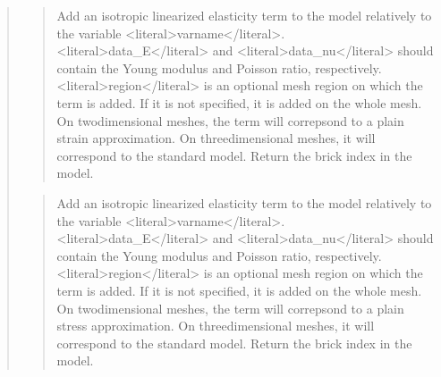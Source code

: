 \documentclass[a4paper,11pt,english]{sphinxmanual}
\begin{document}
\begin{quote}
\sphinxAtStartPar
{}
\begin{quote}

\sphinxAtStartPar
Add an isotropic linearized elasticity term to the model relatively to
the variable \textless{}literal\textgreater{}varname\textless{}/literal\textgreater{}. \textless{}literal\textgreater{}data\_E\textless{}/literal\textgreater{} and \textless{}literal\textgreater{}data\_nu\textless{}/literal\textgreater{} should
contain the Young modulus and Poisson ratio, respectively.
\textless{}literal\textgreater{}region\textless{}/literal\textgreater{} is an optional mesh region on which the term is added.
If it is not specified, it is added
on the whole mesh.
On two\sphinxhyphen{}dimensional meshes, the term will correpsond to a plain strain
approximation. On three\sphinxhyphen{}dimensional meshes, it will correspond to the
standard model.
Return the brick index in the model.
\end{quote}

\sphinxAtStartPar
{}
\begin{quote}

\sphinxAtStartPar
Add an isotropic linearized elasticity term to the model relatively to
the variable \textless{}literal\textgreater{}varname\textless{}/literal\textgreater{}. \textless{}literal\textgreater{}data\_E\textless{}/literal\textgreater{} and \textless{}literal\textgreater{}data\_nu\textless{}/literal\textgreater{} should
contain the Young modulus and Poisson ratio, respectively.
\textless{}literal\textgreater{}region\textless{}/literal\textgreater{} is an optional mesh region on which the term is added.
If it is not specified, it is added
on the whole mesh.
On two\sphinxhyphen{}dimensional meshes, the term will correpsond to a plain stress
approximation. On three\sphinxhyphen{}dimensional meshes, it will correspond to the
standard model.
Return the brick index in the model.
\end{quote}

\sphinxAtStartPar
{}
\begin{quote}


\end{quote}
\end{quote}
\end{document}

